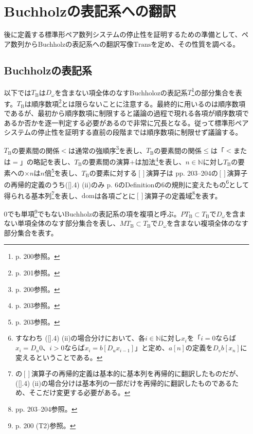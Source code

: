 \documentclass[dvipdfmx,uplatex]{jsarticle}
\theoremstyle{customnonumberbreakfortheorem}
\theoremstyle{customnonumberbreakforproof}
\begin{document}
\section{Buchholzの表記系への翻訳}

後に定義する標準形ペア数列システムの停止性を証明するための準備として、ペア数列からBuchholzの表記系への翻訳写像\(\textrm{Trans}\)を定め、その性質を調べる。


\subsection{Buchholzの表記系}

以下では\(T_{\textrm{B}}\)は\(D_{\omega}\)を含まない項全体のなすBuchholozの表記系\(T\)\footnote{\cite{buc1} p. 200参照。}の部分集合を表す。\(T_{\textrm{B}}\)は順序数項\footnote{\cite{buc1} p. 201参照。}とは限らないことに注意する。最終的に用いるのは順序数項であるが、最初から順序数項に制限すると議論の過程で現れる各項が順序数項であるか否かを逐一判定する必要があるので非常に冗長となる。従って標準形ペアシステムの停止性を証明する直前の段階までは順序数項に制限せず議論する。

\(T_{\textrm{B}}\)の要素間の関係\(<\)は通常の強順序\footnote{\cite{buc1} p. 200参照。}を表し、\(T_{\textrm{B}}\)の要素間の関係\(\leq\)は「\(<\)または\(=\)」の略記を表し、\(T_{\textrm{B}}\)の要素間の演算\(+\)は加法\footnote{\cite{buc1} p. 203参照。}を表し、\(n \in \mathbb{N}\)に対し\(T_{\textrm{B}}\)の要素への\(\times n\)は\(n\)倍\footnote{\cite{buc1} p. 203参照。}を表し、\(T_{\textrm{B}}\)の要素に対する\([]\)演算子は\cite{buc1} pp. 203--204の\([]\)演算子の再帰的定義のうち([].4) (ii)のみ\cite{buc2} p. 6のDefinitionの6の規則に変えたもの\footnote{すなわち\cite{buc1} ([].4) (ii)の場合分けにおいて、各\(i \in \mathbb{N}\)に対し\(x_i\)を「\(i = 0\)ならば\(x_i = D_u 0\)、\(i > 0\)ならば\(x_i = b[D_u x_{i-1}]\)」と定め、\(a[n]\)の定義を\(D_v b[x_n]\)に変えるということである。}として得られる基本列\footnote{\cite{buc1}の\([]\)演算子の再帰的定義は基本的に基本列を再帰的に翻訳したものだが、([].4) (ii)の場合分けは基本列の一部だけを再帰的に翻訳したものであるため、そこだけ変更する必要がある。}を表し、\(\textrm{dom}\)は各項ごとに\([]\)演算子の定義域\footnote{\cite{buc1} pp. 203--204参照。}を表す。

\(0\)でも単項\footnote{\cite{buc1} p. 200 (T2)参照。}でもないBuchholzの表記系の項を複項と呼ぶ。\(PT_{\textrm{B}} \subset T_{\textrm{B}}\)で\(D_{\omega}\)を含まない単項全体のなす部分集合を表し、\(MT_{\textrm{B}} \subset T_{\textrm{B}}\)で\(D_{\omega}\)を含まない複項全体のなす部分集合を表す。
\end{document}
